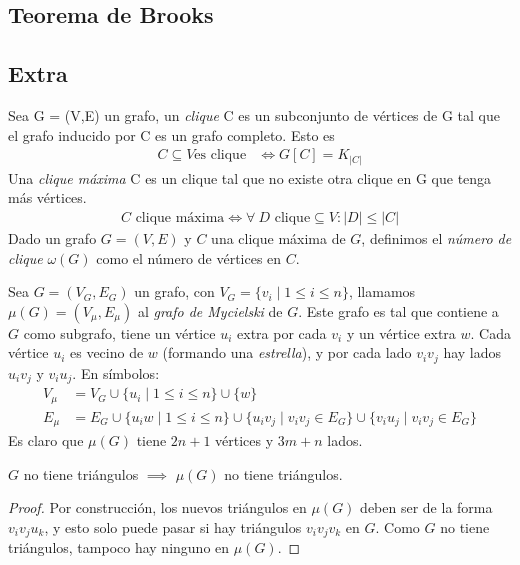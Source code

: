 \subsection{Teorema de Brooks}



\subsection{Extra}
\begin{definition}
Sea G = (V,E) un grafo, un \emph{clique} C es un subconjunto de vértices de G tal que el grafo inducido por C es un grafo completo. Esto es 
\begin{align}
    C \subseteq V \text{es clique} &\iff G[C] = K_{|C|}
\end{align}
Una \emph{clique máxima} C es un clique tal que no existe otra clique en G que tenga más vértices. \begin{align}
    C \text{ clique máxima} \iff \forall~ D \text{ clique} \subseteq V\colon |D| \le |C|
\end{align}
Dado un grafo $G = (V,E)$ y $C$ una clique máxima de $G$, definimos el \emph{número de clique} $\omega(G)$ como el número de vértices en $C$.
\end{definition}

\begin{definition}
Sea $G = (V_G, E_G)$ un grafo, con $V_G = \{v_i \mid 1 \le i \le n\}$, llamamos $\mu(G) = (V_\mu, E_\mu)$ al \emph{grafo de Mycielski} de $G$. Este grafo es tal que contiene a $G$ como subgrafo, tiene un vértice $u_i$ extra por cada $v_i$ y un vértice extra $w$. Cada vértice $u_i$ es vecino de $w$ (formando una \emph{estrella}), y por cada lado $v_iv_j$ hay lados $u_iv_j$ y $v_iu_j$.
En símbolos:
\begin{align}
V_\mu &= V_G \cup \{u_i \mid 1 \le i \le n \} \cup \{w\}\\
E_\mu &= E_G \cup \{ u_i w \mid 1 \le i \le n\} \cup \{u_i v_j \mid v_i v_j \in E_G \} \cup \{v_i u_j \mid v_i v_j \in E_G \}
\end{align}
Es claro que $\mu(G)$ tiene $2n+1$ vértices y $3m+n$ lados.
\end{definition}
\begin{proposition}\label{Mycielski_triangle_free}
$G$ no tiene triángulos $\implies$ $\mu(G)$ no tiene triángulos.
\end{proposition}
\begin{proof}
Por construcción, los nuevos triángulos en $\mu(G)$ deben ser de la forma $v_i v_j u_k$, y esto solo puede pasar si hay triángulos $v_i v_j v_k$ en $G$. Como $G$ no tiene triángulos, tampoco hay ninguno en $\mu(G)$.
\end{proof}

